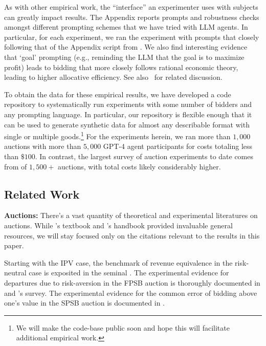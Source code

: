 \documentclass{article} %
\begin{document}
As with other empirical work, the ``interface'' an experimenter uses with subjects can greatly impact results. 
The Appendix reports prompts and robustness checks amongst different prompting schemes that we have tried with LLM agents. 
In particular, for each experiment, we ran the experiment with prompts that closely following that of the Appendix script from \cite{li2017obviously}.
 We also find interesting evidence that `goal' prompting (e.g., reminding the LLM that the goal is to maximize profit) leads to bidding that more closely follows rational economic theory, leading to higher allocative efficiency. 
 See also~\cite{manning2024automated} for related discussion. 

To obtain the data for these empirical results, we have developed a code repository to systematically run experiments 
with some number of bidders
and any prompting language. 
In particular, our repository is flexible enough that it can be used to generate synthetic data for almost any describable format with single or multiple goods.\footnote{We will make the code-base public soon and hope this will facilitate additional empirical work.}
%
For the experiments herein, we ran more than $1,000$ auctions with more than $5,000$ GPT-4 agent participants for costs totaling less than $\$100$. 
In contrast, the largest survey of auction experiments to date comes from \citet{cox1988theory} of $1,500+$ auctions, with total costs likely considerably higher.

\subsection{Related Work}




\textbf{Auctions:}
There's a vast quantity of theoretical and experimental literatures on auctions. 
While \cite{krishna2009auction}'s textbook and \citet{kagel2020handbook}'s handbook provided invaluable general resources, we will stay focused only on the citations relevant to the results in this paper.

Starting with the IPV case, the benchmark of revenue equivalence in the risk-neutral case is exposited in the seminal 
\citet{myerson1981optimal}. 
The experimental evidence for departures due to risk-aversion in the FPSB auction is thoroughly documented in \citet{coppinger1980incentives} and \citet{cox1988theory}'s survey. 
The experimental evidence for the common error of bidding above one's value in the SPSB auction is documented in \citet{kagel1993independent}.
\end{document}
